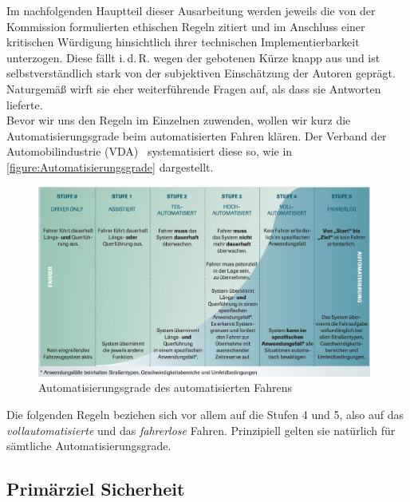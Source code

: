 \documentclass[twoside,a4paper,12pt]{article}
\begin{document}
Im nachfolgenden Hauptteil dieser Ausarbeitung werden jeweils die von der Kommission formulierten ethischen Regeln zitiert und im Anschluss einer kritischen 
Würdigung hinsichtlich ihrer technischen Implementierbarkeit unterzogen. Diese fällt i.\,d.\,R. wegen der gebotenen Kürze knapp aus und ist selbstverständlich
stark von der subjektiven Einschätzung der Autoren geprägt. Naturgemäß wirft sie eher weiterführende Fragen auf, als dass sie Antworten lieferte.\\

Bevor wir uns den Regeln im Einzelnen zuwenden, wollen wir kurz die Automatisierungsgrade beim automatisierten Fahren klären. Der Verband der 
Automobilindustrie (VDA)~\cite{vda} systematisiert diese so, wie in \autoref{figure:Automatisierungsgrade} dargestellt.\\

\begin{figure}[H]
\centering
\includegraphics[width=11cm]{resources/uebersicht-stufen-der-automatisierung.jpg}
\caption[Automatisierungsgrade des automatisierten Fahrens]{Automatisierungsgrade des automatisierten Fahrens~\cite{vda}}
\label{figure:Automatisierungsgrade}
\end{figure}

Die folgenden Regeln beziehen sich vor allem auf die Stufen 4 und 5, also auf das \textit{vollautomatisierte} und das \textit{fahrerlose} Fahren.
Prinzipiell gelten sie natürlich für sämtliche Automatisierungsgrade.

\subsection{Primärziel Sicherheit} \label{PrimaerzielSicherheit}
\end{document}
